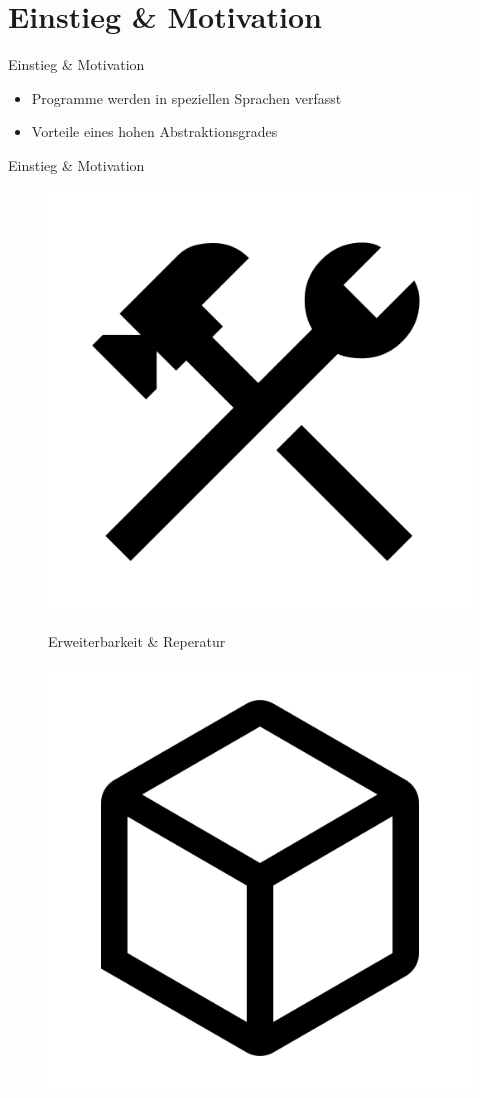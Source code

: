 
\section{Einstieg \& Motivation}
\begin{frame}{Einstieg \& Motivation}
	\begin{itemize}
		\item Programme werden in speziellen Sprachen verfasst
		\item Vorteile eines hohen Abstraktionsgrades
	\end{itemize}
\end{frame}

\begin{frame}{Einstieg \& Motivation}
	\begin{figure}[h]
		\begin{minipage}{.32\textwidth}
			\begin{center}
				\centering
				\centerline{\includegraphics[width=.5\textwidth]{assets/google_icon_construction.png}}
				{\small Erweiterbarkeit \& Reperatur}
			\end{center}
		\end{minipage}
		\pause
		\hfill
		\begin{minipage}{.32\textwidth}
			\begin{center}
				\centerline{\includegraphics[width=.5\textwidth]{assets/google_icon_deployed_code.png}}

\end{center}
\end{minipage}
\end{figure}
\end{frame}
